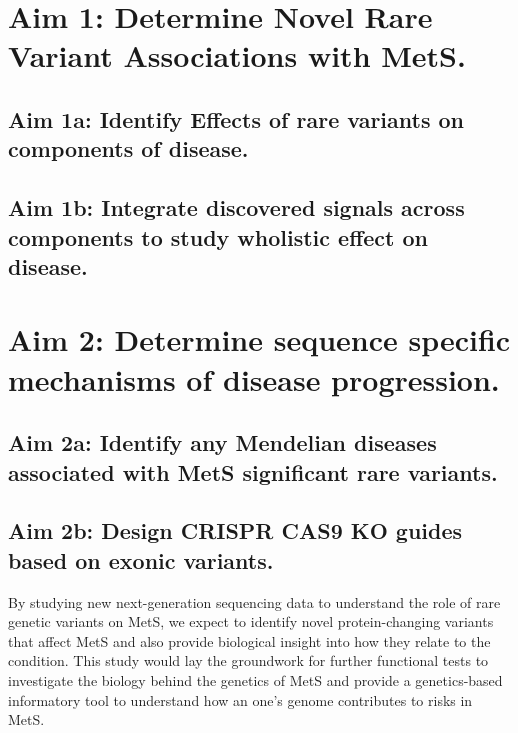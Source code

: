 \documentclass[11pt]{article}
\begin{document}
\section*{Aim 1: Determine Novel Rare Variant Associations with MetS.}

\subsection*{Aim 1a: Identify Effects of rare variants on components of disease.}

\subsection*{Aim 1b: Integrate discovered signals across components to study wholistic effect on disease.}

\section*{Aim 2: Determine sequence specific mechanisms of disease progression.}

\subsection*{Aim 2a: Identify any Mendelian diseases associated with MetS significant rare variants.}

\subsection*{Aim 2b: Design CRISPR CAS9 KO guides based on exonic variants.}

By studying new next-generation sequencing data to understand the role of rare genetic variants on MetS, we expect to identify novel protein-changing variants that affect MetS and also provide biological insight into how they relate to the condition. This study would lay the groundwork for further functional tests to investigate the biology behind the genetics of MetS and provide a genetics-based informatory tool to understand how an one's genome contributes to risks in MetS.

\newpage

 

\end{document}
